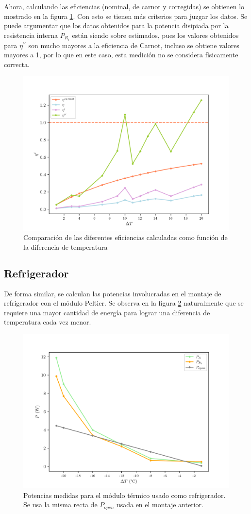 Ahora, calculando las eficiencias (nominal, de carnot y corregidas) se obtienen lo mostrado en la figura \ref{fig:etas}. Con esto se tienen más criterios para juzgar los datos. Se puede argumentar que los datos obtenidos para la potencia disipiada por la resistencia interna $P_{R_i}$ están siendo sobre estimados, pues los valores obtenidos para $\eta^{\prime\prime}$ son mucho mayores a la eficiencia de Carnot, incluso se obtiene valores mayores a 1, por lo que en este caso, esta medición no se considera físicamente correcta. 


\begin{figure}[ht]
    \centering
    \includegraphics[width = 0.6\linewidth]{img/gen_etas.png}
    \caption{Comparación de las diferentes eficiencias calculadas como función de la diferencia de temperatura}
    \label{fig:etas}
\end{figure}

\subsection{Refrigerador}

De forma similar, se calculan las potencias involucradas en el montaje de refrigerador con el módulo Peltier. Se observa en la figura \ref{fig:refri_powers} naturalmente que se requiere una mayor cantidad de energía para lograr una diferencia de temperatura cada vez menor. 

\begin{figure}[ht]
    \centering
    \includegraphics[width = 0.5\linewidth]{img/refri_powers.png}
    \caption{Potencias medidas para el módulo térmico usado como refrigerador. Se usa la misma recta de $P_{open}$ usada en el montaje anterior.}
    \label{fig:refri_powers}
\end{figure}

